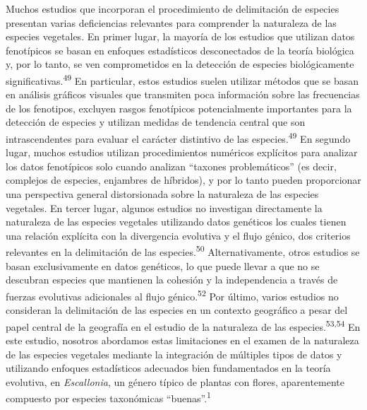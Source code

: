 \documentclass[
  11pt,
]{article}
\begin{document}
Muchos estudios que incorporan el procedimiento de delimitación de especies presentan varias deficiencias relevantes para comprender la naturaleza de las especies vegetales. En primer lugar, la mayoría de los estudios que utilizan datos fenotípicos se basan en enfoques estadísticos desconectados de la teoría biológica y, por lo tanto, se ven comprometidos en la detección de especies biológicamente significativas.\textsuperscript{49} En particular, estos estudios suelen utilizar métodos que se basan en análisis gráficos visuales que transmiten poca información sobre las frecuencias de los fenotipos, excluyen rasgos fenotípicos potencialmente importantes para la detección de especies y utilizan medidas de tendencia central que son intrascendentes para evaluar el carácter distintivo de las especies.\textsuperscript{49} En segundo lugar, muchos estudios utilizan procedimientos numéricos explícitos para analizar los datos fenotípicos solo cuando analizan ``taxones problemáticos'' (es decir, complejos de especies, enjambres de híbridos), y por lo tanto pueden proporcionar una perspectiva general distorsionada sobre la naturaleza de las especies vegetales. En tercer lugar, algunos estudios no investigan directamente la naturaleza de las especies vegetales utilizando datos genéticos los cuales tienen una relación explícita con la divergencia evolutiva y el flujo génico, dos criterios relevantes en la delimitación de las especies.\textsuperscript{50} Alternativamente, otros estudios se basan exclusivamente en datos genéticos, lo que puede llevar a que no se descubran especies que mantienen la cohesión y la independencia a través de fuerzas evolutivas adicionales al flujo génico.\textsuperscript{52} Por último, varios estudios no consideran la delimitación de las especies en un contexto geográfico a pesar del papel central de la geografía en el estudio de la naturaleza de las especies.\textsuperscript{53,54} En este estudio, nosotros abordamos estas limitaciones en el examen de la naturaleza de las especies vegetales mediante la integración de múltiples tipos de datos y utilizando enfoques estadísticos adecuados bien fundamentados en la teoría evolutiva, en \emph{Escallonia}, un género típico de plantas con flores, aparentemente compuesto por especies taxonómicas ``buenas''.\textsuperscript{1}
\end{document}
